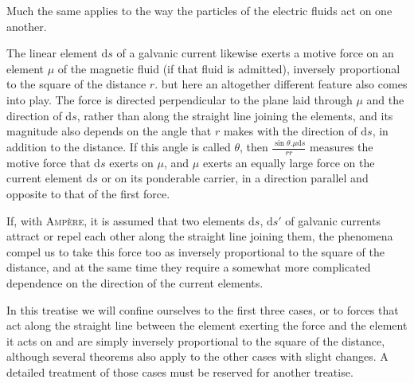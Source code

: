 Much the same applies to the way the particles of the electric fluids act on one another.

The linear element $\mathrm{d}s$ of a galvanic current likewise exerts a motive force on an element $\mu$ of the magnetic fluid (if that fluid is admitted), inversely proportional to the square of the distance $r$. but here an altogether different feature also comes into play. The force is directed perpendicular to the plane laid through $\mu$ and the direction of $\mathrm{d}s$, rather than along the straight line joining the elements, and its magnitude also depends on the angle that $r$ makes with the direction of $\mathrm{d}s$, in addition to the distance. If this angle is called $\theta$, then $\frac{\sin\theta.\mu\mathrm{d}s}{rr}$ measures the motive force that $\mathrm{d}s$ exerts on $\mu$, and $\mu$ exerts an equally large force on the current element $\mathrm{d}s$ or on its ponderable carrier, in a direction parallel and opposite to that of the first force.

If, with \textsc{Ampère}, it is assumed that two elements $\mathrm{d}s$, $\mathrm{d}s'$ of galvanic currents attract or repel each other along the straight line joining them, the phenomena compel us to take this force too as inversely proportional to the square of the distance, and at the same time they require a somewhat more complicated dependence on the direction of the current elements.

In this treatise we will confine ourselves to the first three cases, or to forces that act along the straight line between the element exerting the force and the element it acts on and are simply inversely proportional to the square of the distance, although several theorems also apply to the other cases with slight changes. A detailed treatment of those cases must be reserved for another treatise.

